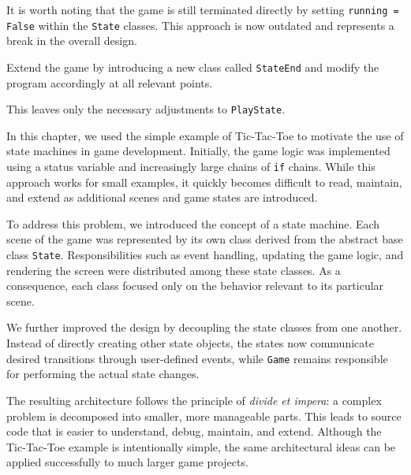 \newpage
{}

\begin{warningbox}
	It is worth noting that the game is still terminated directly by setting \texttt{running = False} within the \texttt{State} classes. This approach is now outdated and represents a break in the overall design.
	
	Extend the game by introducing a new class called \texttt{StateEnd} and modify the program accordingly at all relevant points.
\end{warningbox}

This leaves only the necessary adjustments to \texttt{PlayState}.


\begin{hintbox}[Summary]
	In this chapter, we used the simple example of Tic-Tac-Toe to motivate the use of state machines in game development. Initially, the game logic was implemented using a status variable and increasingly large chains of \texttt{if} chains. While this approach works for small examples, it quickly becomes difficult to read, maintain, and extend as additional scenes and game states are introduced.
	
	To address this problem, we introduced the concept of a state machine. Each scene of the game was represented by its own class derived from the abstract base class \texttt{State}. Responsibilities such as event handling, updating the game logic, and rendering the screen were distributed among these state classes. As a consequence, each class focused only on the behavior relevant to its particular scene.
	
	We further improved the design by decoupling the state classes from one another. Instead of directly creating other state objects, the states now communicate desired transitions through user-defined events, while \texttt{Game} remains responsible for performing the actual state changes.
	
	The resulting architecture follows the principle of \emph{divide et impera}: a complex problem is decomposed into smaller, more manageable parts. This leads to source code that is easier to understand, debug, maintain, and extend. Although the Tic-Tac-Toe example is intentionally simple, the same architectural ideas can be applied successfully to much larger game projects.
\end{hintbox}

